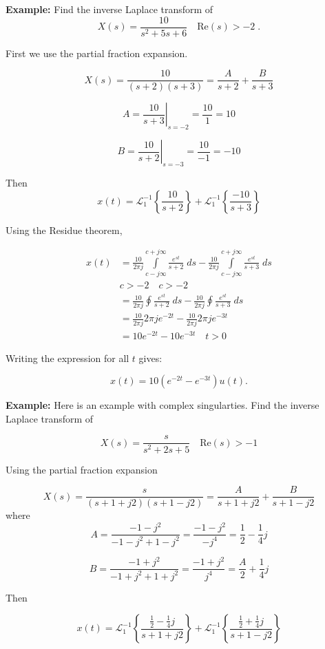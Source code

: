 \documentclass{article}
\begin{document}
\textbf{Example:} Find the inverse Laplace transform of
$$
X(s) = \frac{10}{s^{2} + 5s + 6} \quad \text{Re}(s) >-2 \; .
$$

First we use the partial fraction expansion.

\[
X(s) = \frac{10}{(s+2)(s+3)} =\frac{A}{s+2}+\frac{B}{s+3}
\]

\[
A=\left.\frac{10}{s+3}\right|_{s=-2}=\frac{10}{1}=10
\]

\[
B=\left.\frac{10}{s+2}\right|_{s=-3}=\frac{10}{-1}=-10
\]


Then
\[
x(t)=\mathcal{L}_{1}^{-1}\left\{\frac{10}{s+2}\right\}+\mathcal{L}_{1}^{-1}\left\{\frac{-10}{s+3}\right\}
\]

Using the Residue theorem,

$$
\begin{aligned}
x(t)&=\frac{10}{2 \pi j} \int\limits_{c-j\infty}^{c+j \infty} \frac{e^{s t}}{s+2} \; ds - \frac{10}{2 \pi j} \int\limits_{c-j \infty}^{c+j \infty} \frac{e^{s t}}{s+3} \; ds \\
& c>-2 \quad c>-2 \\
& =\frac{10}{2 \pi j} \oint \frac{e^{s t}}{s+2} \; d s - \frac{10}{2 \pi j} \oint \frac{e^{s t}}{s+3} \; ds \\
& =\frac{10}{2 \pi j} 2 \pi j e^{-2 t} - \frac{10}{2 \pi j} 2 \pi j e^{-3 t} \\
&=10 e^{-2 t}-10 e^{-3 t} \quad t>0
\end{aligned}
$$

Writing the expression for all $t$ gives:

\[
x(t)=10\left(e^{-2 t}-e^{-3 t}\right) u(t) .
\]

\textbf{Example:} Here is an example with complex singularties. Find the inverse Laplace transform of

$$
X(s)=\frac{s}{s^{2}+2 s+5} \quad \text{Re}(s)>-1
$$

Using the partial fraction expansion

\[
X(s) = \frac{s}{(s + 1 + j2)(s + 1 - j2)} = \frac{A}{s + 1 + j2} + \frac{B}{s + 1 - j2} 
\]
where
\[ A=\frac{-1-j^{2}}{-1-j^{2}+1-j^{2}}=\frac{-1-j^{2}}{-j^{4}}=\frac{1}{2}-\frac{1}{4} j
\]

\[
B=\frac{-1+j^{2}}{-1+j^{2}+1+j^{2}}=\frac{-1+j^{2}}{j^{4}}=\frac{A}{2}+\frac{1}{4} j
\]


Then

\[
x(t) = \mathcal{L}_{1}^{-1}\left\{\frac{\frac{1}{2}-\frac{1}{4} j}{s+1+j2}\right\}+\mathcal{L}_{1}^{-1}\left\{\frac{\frac{1}{2}+\frac{1}{4} j}{s+1-j2}\right\}
\]
\end{document}
